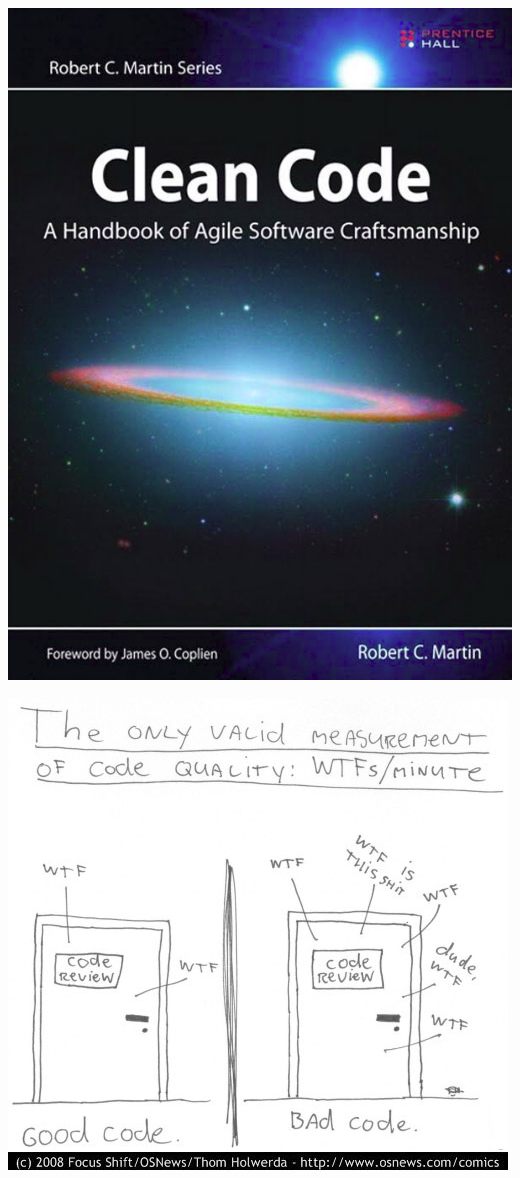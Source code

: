 \documentclass{beamer}
\begin{document}
\begin{frame}
\includegraphics[scale=0.25]{img/CleanCode.png}
\end{frame}

\begin{frame}
\includegraphics[scale=0.25]{img/wtfm.png}
\end{frame}
\end{document}
